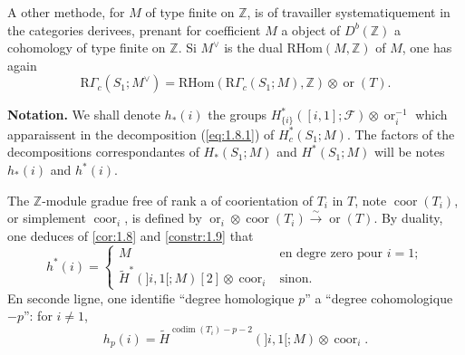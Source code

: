 \documentclass[11pt,a4paper]{article}
\theoremstyle{plain}
\theoremstyle{definition}
\DeclareMathOperator{\codim}{codim}
\newcommand{\coor}{\operatorname{coor}}
\newcommand{\ori}{\operatorname{or}}
\begin{document}
A other methode, for $M$ of type finite on $\mathbb{Z}$, is of travailler systematiquement in the categories derivees, prenant for coefficient $M$ a object of $D^b(\mathbb{Z})$ a cohomology of type finite on $\mathbb{Z}$. Si $M^\vee$ is the dual $\mathrm{RHom}(M,\mathbb{Z})$ of $M$, one has again
\[\mathrm{R}\Gamma_c(S_1;M^\vee) = \mathrm{RHom}(\mathrm{R}\Gamma_c(S_1;M),\mathbb{Z}) \otimes \ori(T).\]

\textbf{Notation.} We shall denote $h_*(i)$ the groups $H^*_{\{i\}}([i,1];\mathcal{F}) \otimes \ori_i^{-1}$ which apparaissent in the decomposition (\ref{eq:1.8.1}) of $H^*_c(S_1;M)$. The factors of the decompositions correspondantes of $H_*(S_1;M)$ and $H^*(S_1;M)$ will be notes $h_*(i)$ and $h^*(i)$.

The $\mathbb{Z}$-module gradue free of rank a of coorientation of $T_i$ in $T$, note $\coor(T_i)$, or simplement $\coor_i$, is defined by $\ori_i \otimes \coor(T_i) \xrightarrow{\sim} \ori(T)$. By duality, one deduces of \ref{cor:1.8} and \ref{constr:1.9} that
\begin{equation}\label{eq:1.10.1}
h^*(i) = \begin{cases}
M & \text{en degre zero pour } i = 1;\\
\widetilde{H}^*(]i,1[;M)[2] \otimes \coor_i & \text{sinon}.
\end{cases}
\tag{1.10.1}
\end{equation}
En seconde ligne, one identifie ``degree homologique $p$'' a ``degree cohomologique $-p$'': for $i \neq 1$,
\[h_p(i) = \widetilde{H}^{\codim(T_i)-p-2}(]i,1[;M) \otimes \coor_i.\]
\end{document}
